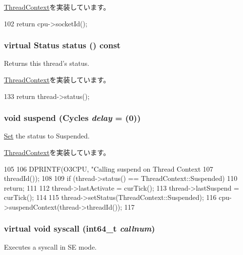 \hyperlink{classThreadContext_aba2c497e8af03f742e5ece80efaeb197}{ThreadContext}を実装しています。


\begin{DoxyCode}
102 { return cpu->socketId(); }
\end{DoxyCode}
\hypertarget{classO3ThreadContext_aac0de8e2cbe41c149f875d5b7ecba1d5}{
\subsubsection[{status}]{\setlength{\rightskip}{0pt plus 5cm}virtual {\bf Status} status () const}}
\label{classO3ThreadContext_aac0de8e2cbe41c149f875d5b7ecba1d5}
Returns this thread's status. 

\hyperlink{classThreadContext_adfba9b39542cba955a02b8ff3ba023a9}{ThreadContext}を実装しています。


\begin{DoxyCode}
133 { return thread->status(); }
\end{DoxyCode}
\hypertarget{classO3ThreadContext_a32072550286c5735b4b95349efa8e4f6}{
\subsubsection[{suspend}]{\setlength{\rightskip}{0pt plus 5cm}void suspend ({\bf Cycles} {\em delay} = {(0)})}}
\label{classO3ThreadContext_a32072550286c5735b4b95349efa8e4f6}
\hyperlink{classSet}{Set} the status to Suspended. 

\hyperlink{classThreadContext_af2ae27d19d77b0301484ac488d97d37b}{ThreadContext}を実装しています。


\begin{DoxyCode}
105 {
106     DPRINTF(O3CPU, "Calling suspend on Thread Context %
107             threadId());
108 
109     if (thread->status() == ThreadContext::Suspended)
110         return;
111 
112     thread->lastActivate = curTick();
113     thread->lastSuspend = curTick();
114 
115     thread->setStatus(ThreadContext::Suspended);
116     cpu->suspendContext(thread->threadId());
117 }
\end{DoxyCode}
\hypertarget{classO3ThreadContext_a064ef126d662dea947c40adfa6b5a490}{
\subsubsection[{syscall}]{\setlength{\rightskip}{0pt plus 5cm}virtual void syscall (int64\_\-t {\em callnum})}}
\label{classO3ThreadContext_a064ef126d662dea947c40adfa6b5a490}
Executes a syscall in SE mode. 

